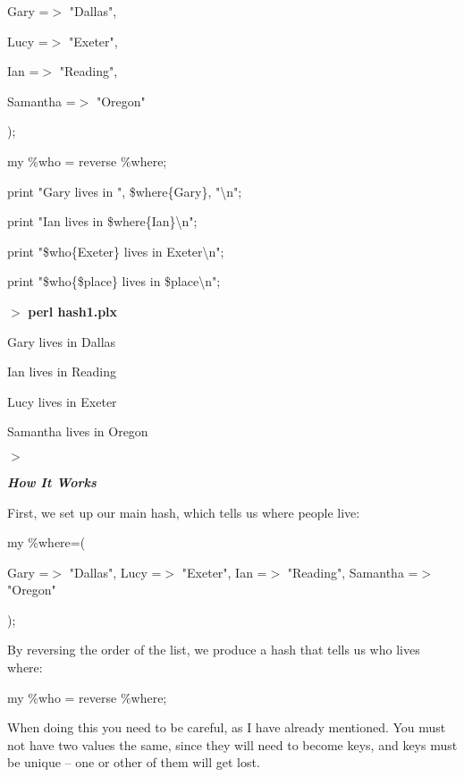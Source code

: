 \documentclass[a4paper,11pt]{book}
\begin{document}
\noindent Gary =$>$ "Dallas",

\noindent Lucy =$>$ "Exeter",

\noindent Ian =$>$ "Reading",

\noindent Samantha =$>$ "Oregon"

\noindent );

\noindent my \%who = reverse \%where;

\noindent 

\noindent print "Gary lives in ", \$where\{Gary\}, "\textbackslash n";

\noindent print "Ian lives in \$where\{Ian\}\textbackslash n";

\noindent print "\$who\{Exeter\} lives in Exeter\textbackslash n";

\noindent print "\$who\{\$place\} lives in \$place\textbackslash n";

\noindent 

\noindent 

\noindent $>$ \textbf{perl hash1.plx}

\noindent Gary lives in Dallas

\noindent Ian lives in Reading

\noindent Lucy lives in Exeter

\noindent Samantha lives in Oregon

\noindent $>$

\noindent 

\noindent \textbf{\textit{How It Works}}

\noindent First, we set up our main hash, which tells us where people live:

\noindent 

\noindent 

\noindent my \%where=(

\noindent Gary =$>$ "Dallas", Lucy =$>$ "Exeter", Ian =$>$ "Reading", Samantha =$>$ "Oregon"

\noindent );

\noindent 

\noindent By reversing the order of the list, we produce a hash that tells us who lives where:

\noindent 

\noindent 

\noindent my \%who = reverse \%where;

\noindent 

\noindent When doing this you need to be careful, as I have already mentioned. You must not have two values the same, since they will need to become keys, and keys must be unique -- one or other of them will get lost.
\end{document}
